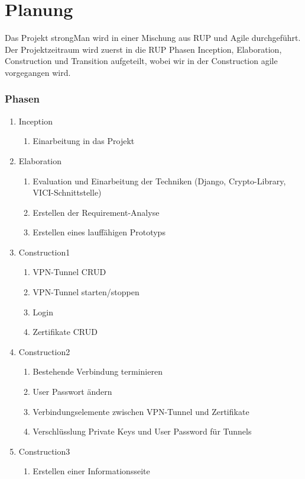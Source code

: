 \section{Planung}
Das Projekt strongMan wird in einer Mischung aus \Gls{RUP} und Agile durchgeführt. Der Projektzeitraum wird zuerst in die RUP Phasen Inception, Elaboration, Construction und Transition aufgeteilt, wobei wir in der Construction agile vorgegangen wird.

\subsubsection{Phasen}
\begin{enumerate}
  \item Inception
  \begin{enumerate}
    \item Einarbeitung in das Projekt
  \end{enumerate}
  \item Elaboration
  \begin{enumerate}
    \item Evaluation und Einarbeitung der Techniken (Django, Crypto-Library, VICI-Schnittstelle)
    \item Erstellen der Requirement-Analyse
    \item Erstellen eines lauffähigen Prototyps
  \end{enumerate}
  \item Construction1
  \begin{enumerate}
    \item VPN-Tunnel CRUD
    \item VPN-Tunnel starten/stoppen
    \item Login 
    \item Zertifikate CRUD
  \end{enumerate}
  \item Construction2
  \begin{enumerate}
    \item Bestehende Verbindung terminieren
    \item User Passwort ändern 
    \item Verbindungselemente zwischen VPN-Tunnel und Zertifikate
    \item Verschlüsslung Private Keys und User Password für Tunnels
  \end{enumerate}
    \item Construction3
  \begin{enumerate}
  	\item Erstellen einer Informationsseite

\end{enumerate}
\end{enumerate}
